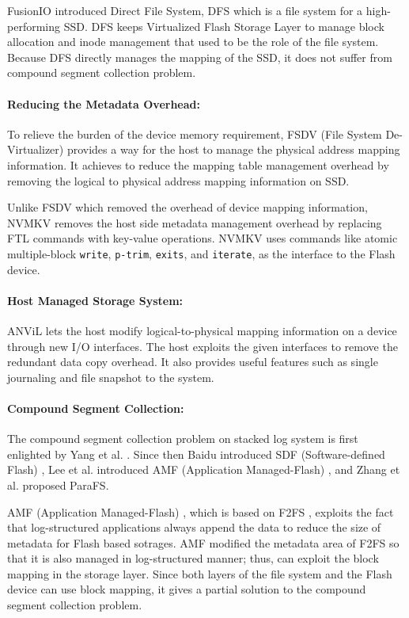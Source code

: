 \documentclass[pageno]{jpaper}
\begin{document}
FusionIO introduced Direct File System, DFS \cite{josephson2010dfs}
which is a file system for a high-performing SSD.  DFS keeps
Virtualized Flash Storage Layer to manage block allocation and inode
management that used to be the role of the file system. Because
DFS directly manages the mapping of the SSD, it does not suffer from
compound segment collection problem.

\paragraph{Reducing the Metadata Overhead:}

To relieve the burden of the device memory requirement, FSDV
(File System De-Virtualizer) \cite{zhangremoving} provides a way for
the host to manage the physical address mapping information. It
achieves to reduce the mapping table management overhead by removing
the logical to physical address mapping information on SSD.

Unlike FSDV which removed the overhead of device mapping information,
NVMKV \cite{nvmkv} removes the host side metadata management overhead
by replacing FTL commands with key-value operations. NVMKV uses
commands like atomic multiple-block \texttt{write}, \texttt{p-trim},
\texttt{exits}, and \texttt{iterate}, as the interface to the Flash
device.


\paragraph{Host Managed Storage System: }
ANViL \cite{anvil} lets the host modify logical-to-physical mapping
information on a device through new I/O interfaces. The host exploits
the given interfaces to remove the redundant data copy overhead. It
also provides useful features such as single journaling and file
snapshot to the system.

\paragraph{Compound Segment Collection:}
The compound segment collection problem on stacked log system is first
enlighted by Yang et al. \cite{yang2014don}. Since then Baidu
introduced SDF (Software-defined Flash) \cite{sdf}, Lee et
al. introduced AMF (Application Managed-Flash)
\cite{lee2016application}, and Zhang et al. proposed
ParaFS\cite{zhang2016parafs}.


AMF (Application Managed-Flash) \cite{lee2016application}, which is
based on F2FS \cite{lee2015f2fs}, exploits the fact that
log-structured applications always append the data to reduce the size
of metadata for Flash based sotrages. AMF modified the metadata area
of F2FS so that it is also managed in log-structured manner; thus, can
exploit the block mapping in the storage layer. Since both layers of
the file system and the Flash device can use block mapping, it gives a
partial solution to the compound segment collection problem.
\end{document}
